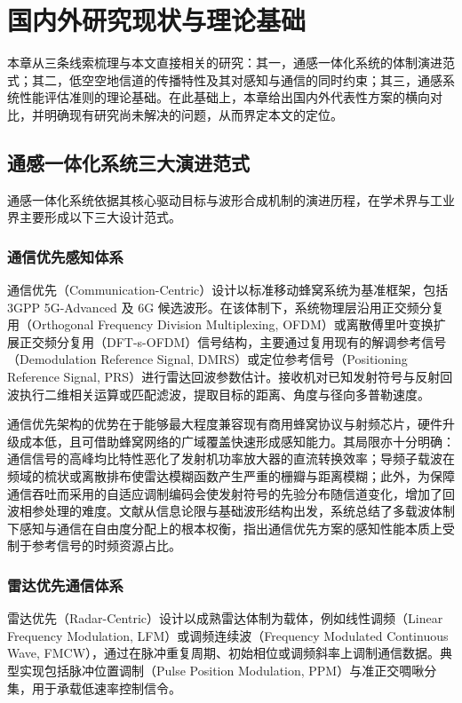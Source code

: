 \chapter{国内外研究现状与理论基础}
\label{chap:related_work}

本章从三条线索梳理与本文直接相关的研究：其一，通感一体化系统的体制演进范式；其二，低空空地信道的传播特性及其对感知与通信的同时约束；其三，通感系统性能评估准则的理论基础。在此基础上，本章给出国内外代表性方案的横向对比，并明确现有研究尚未解决的问题，从而界定本文的定位。

\section{通感一体化系统三大演进范式}
通感一体化系统依据其核心驱动目标与波形合成机制的演进历程，在学术界与工业界主要形成以下三大设计范式。

\subsection{通信优先感知体系}
通信优先（Communication-Centric）设计以标准移动蜂窝系统为基准框架，包括 3GPP 5G-Advanced 及 6G 候选波形。在该体制下，系统物理层沿用正交频分复用（Orthogonal Frequency Division Multiplexing, OFDM）或离散傅里叶变换扩展正交频分复用（DFT-s-OFDM）信号结构，主要通过复用现有的解调参考信号（Demodulation Reference Signal, DMRS）或定位参考信号（Positioning Reference Signal, PRS）进行雷达回波参数估计。接收机对已知发射符号与反射回波执行二维相关运算或匹配滤波，提取目标的距离、角度与径向多普勒速度。

通信优先架构的优势在于能够最大程度兼容现有商用蜂窝协议与射频芯片，硬件升级成本低，且可借助蜂窝网络的广域覆盖快速形成感知能力。其局限亦十分明确：通信信号的高峰均比特性恶化了发射机功率放大器的直流转换效率；导频子载波在频域的梳状或离散排布使雷达模糊函数产生严重的栅瓣与距离模糊；此外，为保障通信吞吐而采用的自适应调制编码会使发射符号的先验分布随信道变化，增加了回波相参处理的难度\cite{xiong2022overview}。文献\cite{luo2024integrated}从信息论限与基础波形结构出发，系统总结了多载波体制下感知与通信在自由度分配上的根本权衡，指出通信优先方案的感知性能本质上受制于参考信号的时频资源占比。

\subsection{雷达优先通信体系}
雷达优先（Radar-Centric）设计以成熟雷达体制为载体，例如线性调频（Linear Frequency Modulation, LFM）或调频连续波（Frequency Modulated Continuous Wave, FMCW），通过在脉冲重复周期、初始相位或调频斜率上调制通信数据。典型实现包括脉冲位置调制（Pulse Position Modulation, PPM）与准正交啁啾分集，用于承载低速率控制信令。

